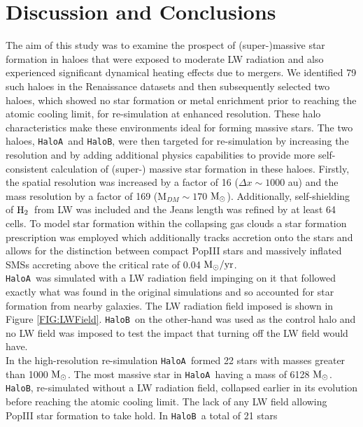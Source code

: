 \documentclass[graphics, twocolumn, usenatbib]{mn2e}
\newcommand{\msolarc} {$\rm{M_{\odot}}$}
\newcommand{\msolaryrc} {$\rm{M_{\odot}/yr}$}
\newcommand{\molH} {$\rm{H_2}$~}
\newcommand{\ha} {\texttt{HaloA~}}
\newcommand{\hb} {\texttt{HaloB~}}
\newcommand{\hbc} {\texttt{HaloB}}
\begin{document}



\section{Discussion and Conclusions} \label{Sec:Discussion}
The aim of this study was to examine the prospect of (super-)massive star formation in haloes
that were exposed to moderate LW radiation and also experienced significant dynamical heating
effects due to mergers. We identified 79 such haloes in the Renaissance 
datasets \citep{Regan_2019} and then subsequently selected two haloes, which showed no star formation or metal enrichment prior to reaching the
atomic cooling limit, for re-simulation at enhanced resolution. These halo characteristics make these environments ideal for forming massive
stars. 
\indent The two haloes, \ha and \hbc, were then targeted for re-simulation by 
increasing the resolution and by adding additional physics capabilities to provide more self-consistent calculation of (super-) massive star formation in these haloes. Firstly, the spatial resolution was increased by a factor of 16 ($\Delta x \sim 1000$ au) and the mass resolution by a factor of
169 (M$_{DM} \sim 170$ \msolarc). Additionally, self-shielding of \molH from LW was included and the Jeans length was refined by at least 64 cells.  To model star formation within the collapsing gas clouds a star formation prescription was employed which additionally tracks accretion
onto the stars and allows for the distinction between compact PopIII stars and massively inflated
SMSs accreting above the critical rate of 0.04 \msolaryrc \citep{Sakurai_2016}.\\
\indent \ha was simulated with a LW radiation field impinging on it that followed exactly what was
found in the original simulations and so accounted for star formation from nearby galaxies. The
LW radiation field imposed is shown in Figure \ref{FIG:LWField}. \hb on the other-hand was used as the
control halo and no LW field was imposed to test the impact that turning off the LW field would have.\\
\indent In the high-resolution re-simulation \ha formed 22 stars with masses greater than 1000
\msolarc. The most massive star in \ha having a mass of 6128 \msolarc. \hbc, re-simulated without
a LW radiation field, collapsed earlier in its evolution before reaching the atomic cooling limit.
The lack of any LW field allowing PopIII star formation to take hold. In \hb a total of 21 stars
\end{document}
